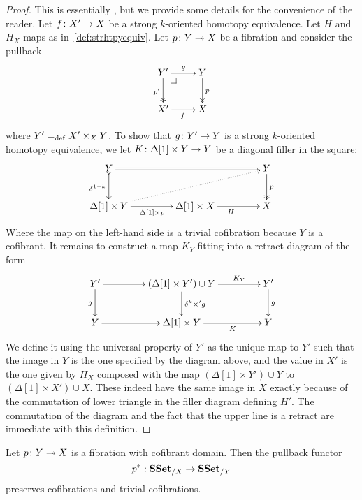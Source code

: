 \documentclass[reqno,10pt,a4paper,oneside,draft]{amsart}
\begin{document}
\begin{proof} This is essentially \cite[Lemma~3.7]{gambino2017frobenius}, but we provide some details
for the convenience of the reader.
Let $f \colon X' \rightarrow X$ be a strong $k$-oriented homotopy equivalence. Let $H$ and $H_X$  maps 
as in~\cref{def:strhtpyequiv}. Let $p \colon Y \twoheadrightarrow X$ be a fibration and consider the pullback
\[
\xymatrix{
Y' \ar[r]^-{g} \drpullback \ar@{->>}[d]_{p'} & Y \ar@{->>}[d]^{p} \\
X' \ar[r]_{f} & X \\
}
\]
where $Y' =_{\operatorname{def}} X' \times_X Y$. 
To show that $g \colon Y' \to Y$ is a strong $k$-oriented homotopy equivalence, we let $K \colon \Delta[1] \times Y \rightarrow Y$ be a diagonal filler in the square:
\[
\xymatrix@C=1.5cm{
Y \ar@{>->}[d]_{\delta^{1-k}} \ar@{=}[rr] & & Y \ar@{->>}[d]^p \\ 
\Delta[1] \times Y \ar[r]_{\Delta[1] \times p} \ar@{.>}[urr] & \Delta[1] \times X \ar[r]_H & X
}\]
Where the map on the left-hand side is a trivial cofibration because $Y$ is a cofibrant.
It remains to construct a map $K_Y$  fitting into a retract diagram of the form
\[
\xymatrix@C=1.5cm{
Y'  \ar[d]_{g} \ar[r] &  (\Delta[1] \times Y')  \cup Y \ar[d]^{\delta^k \times' g} \ar[r]^-{K_Y} & Y' \ar[d]^{g} \\
Y \ar[r] & \Delta[1]  \times Y \ar[r]_-{K} & Y 
}
\]
We define it using the universal property of $Y'$ as the unique map to $Y'$ such that the image in $Y$ is the one specified by the diagram above, and the value in $X'$ is the one given by $H_X$ composed with the map $(\Delta[1] \times Y') \cup Y$ to $(\Delta[1] \times X') \cup X$. These indeed have the same image in $X$ exactly because of the commutation of lower triangle in the filler diagram defining $H'$. The commutation of the diagram and the fact that the upper line is a retract are immediate with this definition.
\end{proof}



\begin{proposition}\label{prop:Frobenius}
Let $p \colon Y \twoheadrightarrow X$ is a fibration with cofibrant domain. Then the pullback functor 
\[
p^* : \mathbf{SSet}_{/X} \rightarrow \mathbf{SSet}_{/Y}
\] 
preserves cofibrations and trivial cofibrations.
\end{proposition}
\end{document}
